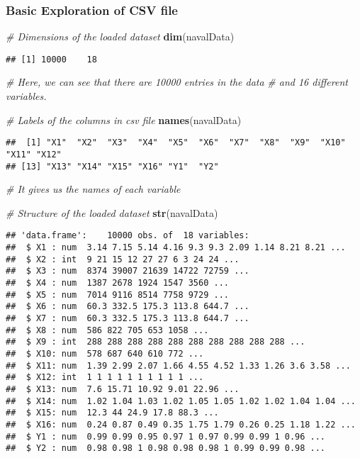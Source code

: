 \documentclass[
]{article}
\newenvironment{Shaded}{\begin{snugshade}}{\end{snugshade}}
\newcommand{\CommentTok}[1]{\textcolor[rgb]{0.56,0.35,0.01}{\textit{#1}}}
\newcommand{\KeywordTok}[1]{\textcolor[rgb]{0.13,0.29,0.53}{\textbf{#1}}}
\newcommand{\NormalTok}[1]{#1}
\begin{document}
\hypertarget{basic-exploration-of-csv-file}{%
\subsubsection{Basic Exploration of CSV
file}\label{basic-exploration-of-csv-file}}

\begin{Shaded}
\begin{Highlighting}[]
\CommentTok{# Dimensions of the loaded dataset}
\KeywordTok{dim}\NormalTok{(navalData)}
\end{Highlighting}
\end{Shaded}

\begin{verbatim}
## [1] 10000    18
\end{verbatim}

\begin{Shaded}
\begin{Highlighting}[]
\CommentTok{# Here, we can see that there are 10000 entries in the data }
\CommentTok{# and 16 different variables.}

\CommentTok{# Labels of the columns in csv file}
\KeywordTok{names}\NormalTok{(navalData)      }
\end{Highlighting}
\end{Shaded}

\begin{verbatim}
##  [1] "X1"  "X2"  "X3"  "X4"  "X5"  "X6"  "X7"  "X8"  "X9"  "X10" "X11" "X12"
## [13] "X13" "X14" "X15" "X16" "Y1"  "Y2"
\end{verbatim}

\begin{Shaded}
\begin{Highlighting}[]
\CommentTok{# It gives us the names of each variable}

\CommentTok{# Structure of the loaded dataset}
\KeywordTok{str}\NormalTok{(navalData)        }
\end{Highlighting}
\end{Shaded}

\begin{verbatim}
## 'data.frame':    10000 obs. of  18 variables:
##  $ X1 : num  3.14 7.15 5.14 4.16 9.3 9.3 2.09 1.14 8.21 8.21 ...
##  $ X2 : int  9 21 15 12 27 27 6 3 24 24 ...
##  $ X3 : num  8374 39007 21639 14722 72759 ...
##  $ X4 : num  1387 2678 1924 1547 3560 ...
##  $ X5 : num  7014 9116 8514 7758 9729 ...
##  $ X6 : num  60.3 332.5 175.3 113.8 644.7 ...
##  $ X7 : num  60.3 332.5 175.3 113.8 644.7 ...
##  $ X8 : num  586 822 705 653 1058 ...
##  $ X9 : int  288 288 288 288 288 288 288 288 288 288 ...
##  $ X10: num  578 687 640 610 772 ...
##  $ X11: num  1.39 2.99 2.07 1.66 4.55 4.52 1.33 1.26 3.6 3.58 ...
##  $ X12: int  1 1 1 1 1 1 1 1 1 1 ...
##  $ X13: num  7.6 15.71 10.92 9.01 22.96 ...
##  $ X14: num  1.02 1.04 1.03 1.02 1.05 1.05 1.02 1.02 1.04 1.04 ...
##  $ X15: num  12.3 44 24.9 17.8 88.3 ...
##  $ X16: num  0.24 0.87 0.49 0.35 1.75 1.79 0.26 0.25 1.18 1.22 ...
##  $ Y1 : num  0.99 0.99 0.95 0.97 1 0.97 0.99 0.99 1 0.96 ...
##  $ Y2 : num  0.98 0.98 1 0.98 0.98 0.98 1 0.99 0.99 0.98 ...
\end{verbatim}
\end{document}
